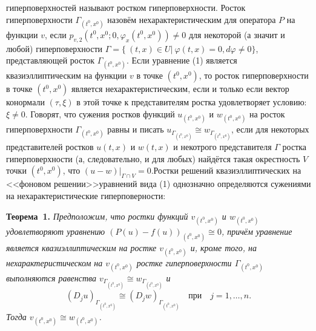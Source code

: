 гиперповерхностей называют ростком гиперповерхности.
Росток гиперповерхности $\Gamma_{(t^0,x^0)}$ назовём нехарактеристическим
для оператора $P$ на функции $v$, если
$p_{v,2}(t^0,x^0;0,\varphi_{x}(t^0,x^0))\not=0$
для некоторой (а значит и любой) гиперповерхности 
$\Gamma= \{~(t,x) \in U \vert~\varphi (t,x) =0, d\varphi\not=0\}$, представляющей росток $\Gamma_{(t^0,x^0)}$.
Если уравнение (1) является квазиэллиптическим на функции $v$ в точке $(t^0,x^0)$, то росток гиперповерхности в точке $(t^0,x^0)$ является нехарактеристическим, если и только если вектор конормали $(\tau,\xi)$ в этой точке к представителям ростка удовлетворяет условию: $\xi\not=0$.
Говорят, что сужения ростков функций $u_{(t^0,x^0)}$ и $w_{(t^0,x^0)}$
на росток гиперповерхности $\Gamma_{(t^0,x^0)}$ равны и писать
$u_{\Gamma_{(t^0,x^0)}}\cong w_{\Gamma_{(t^0,x^0)}}$,
если для некоторых представителей ростков $u(t,x)$ и $w(t,x)$  и некотрого представителя $\Gamma$ ростка гиперповерхности (а, следовательно, и для любых)
найдётся такая окрестность $V$ точки $(t^0,x^0)$,
что $(u-w)|_{\Gamma\cap V}=0$.\linebreak Ростки решений квазиэллиптических на <<фоновом решении>>\linebreak уравнений вида (1) однозначно определяются сужениями на нехарактеристические гиперповерности:


\textbf{Теорема~1.} {\it
Предположим, что ростки функций $v_{(t^0,x^0)}$ и $w_{(t^0,x^0)}$ удовлетворяют уравнению $(P(u)-f(u))_{(t^0,x^0)}\cong 0$, причём уравнение
является квазиэллиптическим на ростке $v_{(t^0,x^0)}$ и, кроме того, на нехарактеристическом на $v_{(t^0,x^0)}$ ростке гиперповерхности
$\Gamma_{(t^0,x^0)}$ выполняются равенства
$v_{\Gamma_{(t^0,x^0)}}\cong w_{\Gamma_{(t^0,x^0)}}$ и
$$
(D_ju)_{\Gamma_{(t^0,x^0)}}\cong (D_jw)_{\Gamma_{(t^0,x^0)}} \mbox{~~~при~~~}
j=1,\dots,n.
$$
Тогда $v_{(t^0,x^0)}\cong w_{(t^0,x^0)}$.
}


